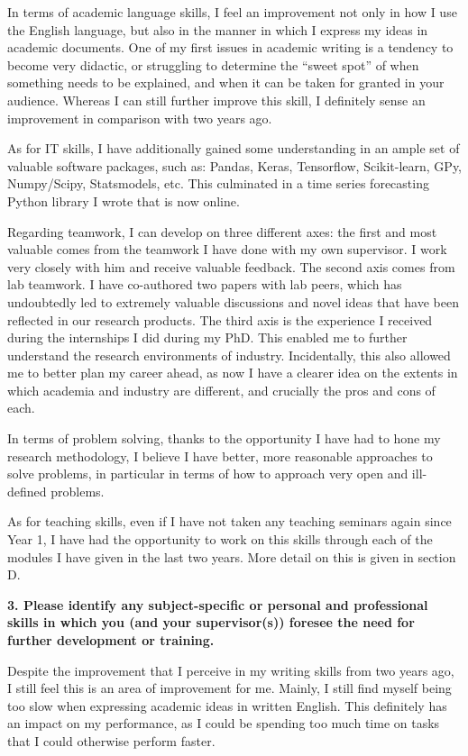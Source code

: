 \documentclass[pdftex,12pt,a4paper]{article}
\theoremstyle{definition}
\theoremstyle{remark}
\begin{document}
In terms of academic language skills, I feel an improvement not only in how I use the English language, but also in the manner in which I express my ideas in academic documents. One of my first issues in academic writing is a tendency to become very didactic, or struggling to determine the “sweet spot” of when something needs to be explained, and when it can be taken for granted in your audience. Whereas I can still further improve this skill, I definitely sense an improvement in comparison with two years ago.

As for IT skills, I have additionally gained some understanding in an ample set of valuable software packages, such as: Pandas, Keras, Tensorflow, Scikit-learn, GPy, Numpy/Scipy, Statsmodels, etc. This culminated in a time series forecasting Python library I wrote that is now online. 

Regarding teamwork, I can develop on three different axes: the first and most valuable comes from the teamwork I have done with my own supervisor. I work very closely with him and receive valuable feedback. The second axis comes from lab teamwork. I have co-authored two papers with lab peers, which has undoubtedly led to extremely valuable discussions and novel ideas that have been reflected in our research products. The third axis is the experience I received during the internships I did during my PhD. This enabled me to further understand the research environments of industry. Incidentally, this also allowed me to better plan my career ahead, as now I have a clearer idea on the extents in which academia and industry are different, and crucially the pros and cons of each.

In terms of problem solving, thanks to the opportunity I have had to hone my research methodology, I believe I have better, more reasonable approaches to solve problems, in particular in terms of how to approach very open and ill-defined problems.

As for teaching skills, even if I have not taken any teaching seminars again since Year 1, I have had the opportunity to work on this skills through each of the modules I have given in the last two years. More detail on this is given in section D.

\textbf{3. Please identify any subject-specific or personal and professional skills in which you (and your supervisor(s)) foresee the need for further development or training.}

Despite the improvement that I perceive in my writing skills from two years ago, I still feel this is an area of improvement for me. Mainly, I still find myself being too slow when expressing academic ideas in written English. This definitely has an impact on my performance, as I could be spending too much time on tasks that I could otherwise perform faster.
\end{document}
